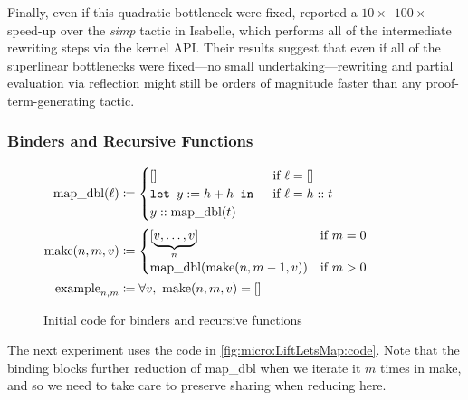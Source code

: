 Finally, even if this quadratic bottleneck were fixed, \textcite{Aehlig} reported a $10\times$--$100\times$ speed-up over the \emph{simp} tactic in Isabelle, which performs all of the intermediate rewriting steps via the kernel API.
Their results suggest that even if all of the superlinear bottlenecks were fixed---no small undertaking---rewriting and partial evaluation via reflection might still be orders of magnitude faster than any proof-term-generating tactic.

\subsubsection{Binders and Recursive Functions}\label{sec:micro:LiftLetsMap}

\begin{figure}
{\small %
$\begin{aligned}
  \text{map\_dbl}(\ell) & \defeq \begin{cases} [] & \text{if }\ell = [] \\
      \letin[{y := h + h}{}] & \text{if }\ell = h::t \\
      y :: \text{map\_dbl}(t) &
      \end{cases} \\
  \text{make}(n, m, v) & \defeq \begin{cases} [\underbrace{v, \ldots, v}_n] & \text{if }m = 0 \\
      \text{map\_dbl}(\text{make}(n, m-1, v)) & \text{if }m > 0
      \end{cases} \\
  \text{example}_{n, m} & \defeq \forall v,\ \text{make}(n, m, v) = []
\end{aligned}$}%
\caption{\label{fig:micro:LiftLetsMap:code}Initial code for binders and recursive functions}
\end{figure}

The next experiment uses the code in \autoref{fig:micro:LiftLetsMap:code}.
Note that the  binding blocks further reduction of map\_dbl when we iterate it $m$ times in make, and so we need to take care to preserve sharing when reducing here.

